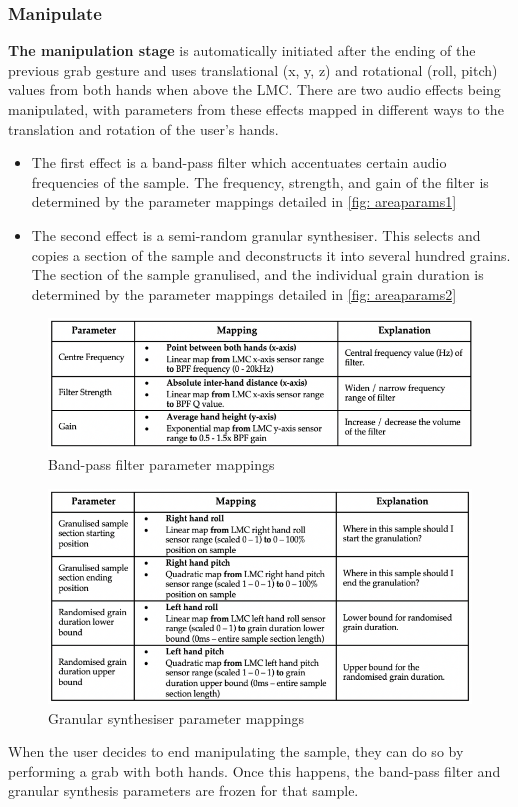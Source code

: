 \subsubsection{Manipulate}                      \label{sec: area-system-software-manip}
\textbf{The manipulation stage} is automatically initiated after the ending of the previous grab gesture and uses translational (x, y, z) and rotational (roll, pitch) values from both hands when above the LMC. There are two audio effects being manipulated, with parameters from these effects mapped in different ways to the translation and rotation of the user’s hands.
\begin{itemize}
    \item The first effect is a band-pass filter which accentuates certain audio frequencies of the sample. The frequency, strength, and gain of the filter is determined by the parameter mappings detailed in \autoref{fig: areaparams1}
    \item The second effect is a semi-random granular synthesiser. This selects and copies a section of the sample and deconstructs it into several hundred grains. The section of the sample granulised, and the individual grain duration is determined by the parameter mappings detailed in \autoref{fig: areaparams2} 
\end{itemize}
\begin{figure}
    \centering
    \includegraphics[width=0.8\linewidth]{figures/05-area/areatechnical_param1.png}
    \caption{Band-pass filter parameter mappings}
    \label{fig: areaparams1}
\end{figure}

\begin{figure}
    \centering
    \includegraphics[width=0.8\linewidth]{figures/05-area/areatechnical_param2.png}
    \caption{Granular synthesiser parameter mappings}
    \label{fig: areaparams2}
\end{figure}
When the user decides to end manipulating the sample, they can do so by performing a grab with both hands. Once this happens, the band-pass filter and granular synthesis parameters are frozen for that sample.

